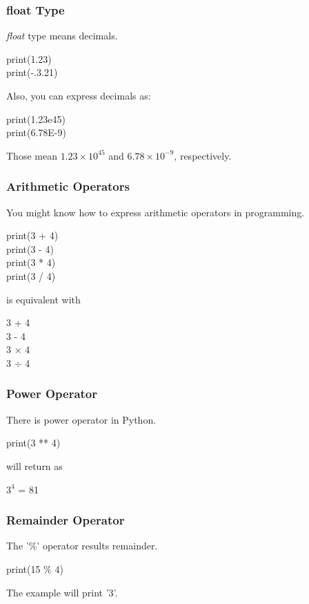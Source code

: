 \documentclass{beamer}
\begin{document}
	\begin{frame}
		\frametitle{float Type}
		\textit{float} type means decimals.
		\begin{example}
			print(1.23) \\
			print(-.3.21)
		\end{example}
		Also, you can express decimals as:
		\begin{example}
			print(1.23e45) \\
			print(6.78E-9)
		\end{example}
		Those mean $1.23 \times 10^{45}$ and $6.78 \times 10^{-9}$, respectively.
	\end{frame}

	\begin{frame}
		\frametitle{Arithmetic Operators}
		You might know how to express arithmetic operators in programming.
		\begin{example}
			print(3 + 4) \\
			print(3 - 4) \\
			print(3 * 4) \\
			print(3 / 4) 
		\end{example}
	
		is equivalent with
		
		\begin{example}
			3 + 4 \\
			3 - 4 \\
			3 $\times$ 4 \\
			3 $\div$ 4
		\end{example}
	\end{frame}

	\begin{frame}
		\frametitle{Power Operator}
		There is power operator in Python.
		\begin{example}
			print(3 ** 4)
		\end{example}
		will return as
		\begin{example}
			$3^4$ = 81
		\end{example}
	\end{frame}

	\begin{frame}
		\frametitle{Remainder Operator}
		The '\%' operator results remainder.
		
		\begin{example}
			print(15 \% 4)
		\end{example}
	
		The example will print '3'.
	\end{frame}
\end{document}

